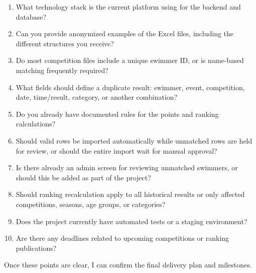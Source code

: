 \documentclass[11pt,a4paper]{article}
\begin{document}
\begin{enumerate}
\item What technology stack is the current platform using for the backend and database?
\item Can you provide anonymized examples of the Excel files, including the different structures you receive?
\item Do most competition files include a unique swimmer ID, or is name-based matching frequently required?
\item What fields should define a duplicate result: swimmer, event, competition, date, time/result, category, or another combination?
\item Do you already have documented rules for the points and ranking calculations?
\item Should valid rows be imported automatically while unmatched rows are held for review, or should the entire import wait for manual approval?
\item Is there already an admin screen for reviewing unmatched swimmers, or should this be added as part of the project?
\item Should ranking recalculation apply to all historical results or only affected competitions, seasons, age groups, or categories?
\item Does the project currently have automated tests or a staging environment?
\item Are there any deadlines related to upcoming competitions or ranking publications?
\end{enumerate}

Once these points are clear, I can confirm the final delivery plan and milestones.\par
\end{document}
